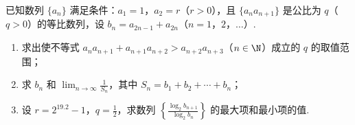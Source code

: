\documentclass[UTF8,a4paper,oneside,11pt]{ctexbook}
\begin{document}
\begin{problem}
已知数列 \(\{a_n\}\) 满足条件：\(a_1 = 1\)，\(a_2 = r\)（\(r > 0\)），且 \(\{a_n a_{n + 1}\}\) 是公比为 \(q\)（\(q > 0\)）的等比数列，设 \(b_n = a_{2n - 1} + a_{2n}\)（\(n = 1\)，\(2\)，\(\dots\)）.

\begin{enumerate}
\item 求出使不等式 \(a_na_{n + 1} + a_{n + 1}a_{n + 2} > a_{n + 2}a_{n + 3}\)（\(n \in \N\)）成立的 \(q\) 的取值范围；
\item 求 \(b_n\) 和 \(\displaystyle\lim_{n \to \infty}\frac{1}{S_n}\)，其中 \(S_n = b_1 + b_2 + \cdots + b_n\)；
\item 设 \(r = 2^{19.2} - 1\)，\(q = \frac{1}{2}\)，求数列 \(\left\{\frac{\log_2 b_{n + 1}}{\log_2 b_n}\right\}\) 的最大项和最小项的值.
\end{enumerate}
\end{problem}
\end{document}

